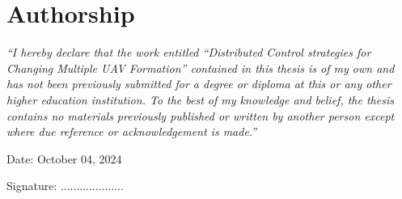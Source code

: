 \chapter*{Authorship}
\textit{``I hereby declare that the work entitled ``Distributed Control strategies for Changing Multiple UAV Formation'' contained in this thesis is of my own and has not been previously submitted for a degree or diploma at this or any other higher education institution. To the best of my knowledge and belief, the thesis contains no materials previously published or written by another person except where due reference or acknowledgement is made.''
}
\vspace{0.5cm}

\begin{flushleft}
    Date: October 04, 2024\quad\par

    \vspace{0.5cm}
    
    Signature: ....................
\end{flushleft}